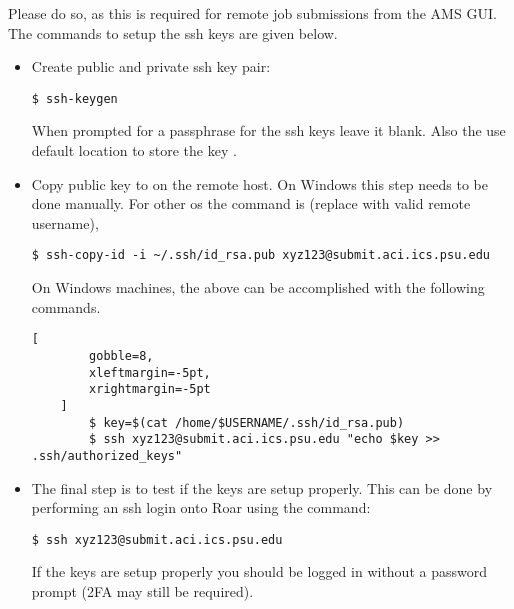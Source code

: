 Please do so, as this is required for remote job submissions from the AMS GUI. 
The commands to setup the ssh keys are given below.
\begin{itemize}
    \item 
    Create public and private ssh key pair: 
    \begin{lstlisting}[gobble=8]
        $ ssh-keygen
    \end{lstlisting}
    When prompted for a passphrase for the ssh keys leave it blank. Also the use default location to store the key .
    \item 
    Copy public key to  on the remote host. On Windows this step needs to be done manually. For other os the command is (replace  with valid remote username),  
    \begin{lstlisting}[gobble=8]
        $ ssh-copy-id -i ~/.ssh/id_rsa.pub xyz123@submit.aci.ics.psu.edu
    \end{lstlisting}
    On Windows machines, the above can be accomplished with the following commands. 
    \begin{lstlisting}[
        gobble=8,
        xleftmargin=-5pt,
        xrightmargin=-5pt
    ]
        $ key=$(cat /home/$USERNAME/.ssh/id_rsa.pub)
        $ ssh xyz123@submit.aci.ics.psu.edu "echo $key >> .ssh/authorized_keys"
    \end{lstlisting}
    \item 
    The final step is to test if the keys are setup properly. 
    This can be done by performing an ssh login onto Roar using the command:
    \begin{lstlisting}[gobble=8]
        $ ssh xyz123@submit.aci.ics.psu.edu
    \end{lstlisting}
    If the keys are setup properly you should be logged in without a password prompt (2FA may still be required). 
\end{itemize}
 
\pagebreak